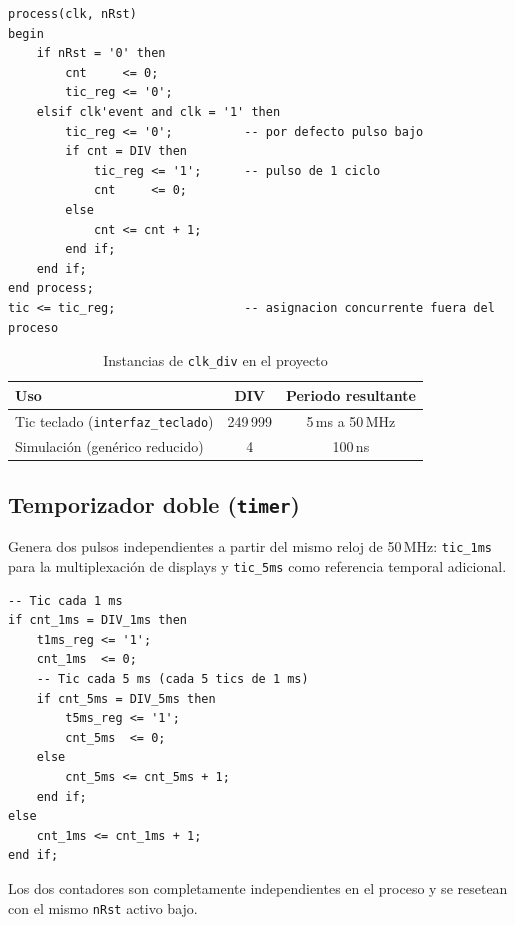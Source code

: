 \documentclass[memoria_final]{subfiles}
\begin{document}
\begin{lstlisting}[caption={Implementación de \texttt{clk\_div.vhd}}]
process(clk, nRst)
begin
    if nRst = '0' then
        cnt     <= 0;
        tic_reg <= '0';
    elsif clk'event and clk = '1' then
        tic_reg <= '0';          -- por defecto pulso bajo
        if cnt = DIV then
            tic_reg <= '1';      -- pulso de 1 ciclo
            cnt     <= 0;
        else
            cnt <= cnt + 1;
        end if;
    end if;
end process;
tic <= tic_reg;                  -- asignacion concurrente fuera del proceso
\end{lstlisting}

\begin{table}[H]
  \centering
  \caption{Instancias de \texttt{clk\_div} en el proyecto}
  \begin{tabular}{lcc}
    \toprule
    \textbf{Uso} & \textbf{DIV} & \textbf{Periodo resultante} \\
    \midrule
    Tic teclado (\texttt{interfaz\_teclado}) & 249\,999 & 5\,ms a 50\,MHz \\
    Simulación (genérico reducido)           & 4        & 100\,ns \\
    \bottomrule
  \end{tabular}
\end{table}

\subsection{Temporizador doble (\texttt{timer})}

Genera dos pulsos independientes a partir del mismo reloj de 50\,MHz:
\texttt{tic\_1ms} para la multiplexación de displays y \texttt{tic\_5ms}
como referencia temporal adicional.

\begin{lstlisting}[caption={Generación de \texttt{tic\_1ms} y \texttt{tic\_5ms} en \texttt{timer.vhd}}]
-- Tic cada 1 ms
if cnt_1ms = DIV_1ms then
    t1ms_reg <= '1';
    cnt_1ms  <= 0;
    -- Tic cada 5 ms (cada 5 tics de 1 ms)
    if cnt_5ms = DIV_5ms then
        t5ms_reg <= '1';
        cnt_5ms  <= 0;
    else
        cnt_5ms <= cnt_5ms + 1;
    end if;
else
    cnt_1ms <= cnt_1ms + 1;
end if;
\end{lstlisting}

Los dos contadores son completamente independientes en el proceso y se resetean
con el mismo \texttt{nRst} activo bajo.

\end{document}
